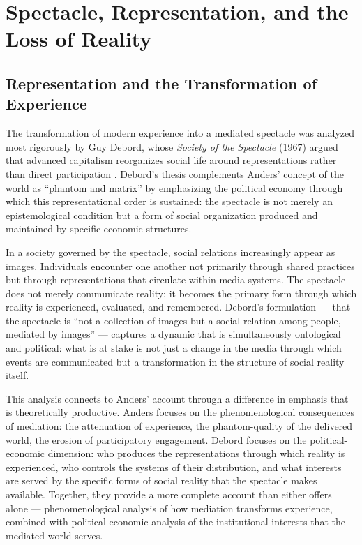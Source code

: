 \documentclass[12pt]{memoir}
\begin{document}
\section{Spectacle, Representation, and the Loss of Reality}
\label{sec:spectacle}

\subsection{Representation and the Transformation of Experience}

The transformation of modern experience into a mediated spectacle was analyzed most
rigorously by Guy Debord, whose \textit{Society of the Spectacle} (1967) argued that
advanced capitalism reorganizes social life around representations rather than direct
participation \citep{debord1967spectacle}. Debord's thesis complements Anders' concept
of the world as \enquote{phantom and matrix} by emphasizing the political economy
through which this representational order is sustained: the spectacle is not merely
an epistemological condition but a form of social organization produced and maintained
by specific economic structures.

In a society governed by the spectacle, social relations increasingly appear as images.
Individuals encounter one another not primarily through shared practices but through
representations that circulate within media systems. The spectacle does not merely
communicate reality; it becomes the primary form through which reality is experienced,
evaluated, and remembered. Debord's formulation — that the spectacle is \enquote{not a
collection of images but a social relation among people, mediated by images} — captures
a dynamic that is simultaneously ontological and political: what is at stake is not
just a change in the media through which events are communicated but a transformation
in the structure of social reality itself.

This analysis connects to Anders' account through a difference in emphasis that is
theoretically productive. Anders focuses on the phenomenological consequences of
mediation: the attenuation of experience, the phantom-quality of the delivered world,
the erosion of participatory engagement. Debord focuses on the political-economic
dimension: who produces the representations through which reality is experienced,
who controls the systems of their distribution, and what interests are served by
the specific forms of social reality that the spectacle makes available. Together,
they provide a more complete account than either offers alone — phenomenological
analysis of how mediation transforms experience, combined with political-economic
analysis of the institutional interests that the mediated world serves.
\end{document}
